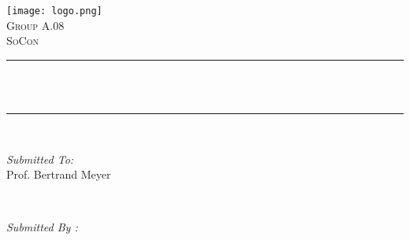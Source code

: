 \begin{titlepage}
    \centering
    \vspace*{0.2 cm}
    \hspace*{-1.1cm}\texttt{[image: logo.png]}\\[1.0 cm]   %
    \textsc{\LARGE Group A.08}\\[2.0 cm]    %
    \textsc{\Large SoCon}\\[0.5 cm]             %
    \rule{\linewidth}{0.2 mm} \\[0.4 cm]
    { \huge \bfseries \thetitle}\\
    \rule{\linewidth}{0.2 mm} \\[1.5 cm]

    \begin{minipage}{0.4\textwidth}
        \begin{flushleft} \large
            \emph{Submitted To:}\\
            Prof. Bertrand Meyer\\
            \end{flushleft}
            \end{minipage}~
            \begin{minipage}{0.4\textwidth}

            \begin{flushright} \large
            \emph{Submitted By :} \\
            \groupName\\~\\
            \studentOne\\
            \studentTwo\\
            \studentThree\\
        \end{flushright}

    \end{minipage}\\[2 cm]
    \vfill
    

\end{titlepage}
